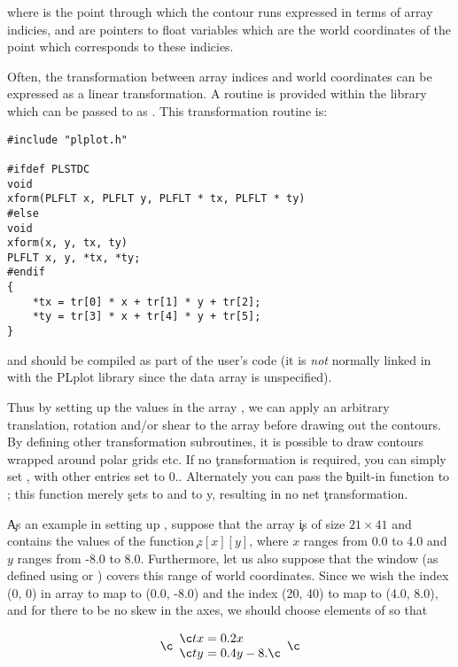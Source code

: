 
where  is the point through which the contour runs
expressed in terms of array indicies, and  are pointers
to float variables which are the world coordinates of the point which
corresponds to these indicies.

Often, the transformation between array indices and world coordinates can be
expressed as a linear transformation.  A routine is provided within the
library which can be passed to  as .  This
transformation routine is:

\begin{verbatim}
#include "plplot.h"

#ifdef PLSTDC
void 
xform(PLFLT x, PLFLT y, PLFLT * tx, PLFLT * ty)
#else
void 
xform(x, y, tx, ty)
PLFLT x, y, *tx, *ty;
#endif
{
    *tx = tr[0] * x + tr[1] * y + tr[2];
    *ty = tr[3] * x + tr[4] * y + tr[5];
}
\end{verbatim}

and should be compiled as part of the user's code (it is \emph{not}
normally linked in with the PLplot library since the  data
array is unspecified).

Thus by setting up the values in the array , we can apply an
arbitrary translation, rotation and/or shear to the array before drawing
out the contours.  By defining other transformation subroutines, it is
possible to draw contours wrapped around polar grids etc.  If no
\c transformation is required, you can simply set , with other entries set to $0.$.  Alternately you can pass the
\c built-in function  to ; this function merely
\c sets  to  and  to {y}, resulting in no net
\c transformation.

\c As an example in setting up , suppose that the array 
\c is of size $21 \times 41$ and contains the values of the function
\c $z[x][y]$, where $x$ ranges from 0.0 to 4.0 and $y$ ranges from -8.0 to
8.0.  Furthermore, let us also suppose that the window (as defined using
 or ) covers this range of world coordinates.
Since we wish the index (0, 0) in array  to map to (0.0, -8.0)
and the index (20, 40) to map to (4.0, 8.0), and for there to be no skew
in the axes, we should choose elements of  so that

\c \[
\c    \begin{array}{l@{\; = \;}l}
\c    tx & 0.2x \\
\c    ty & 0.4y - 8.
\c    \end{array}
\c \]

